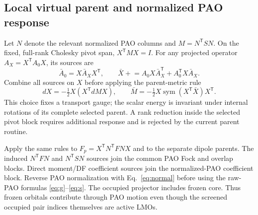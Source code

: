 \documentclass[11pt]{article}
\newcommand{\T}{^{\mathsf T}}
\newcommand{\sym}{\operatorname{sym}}
\begin{document}
\subsection{Local virtual parent and normalized PAO response}
Let $N$ denote the relevant normalized PAO columns and $M=N\T S N$.
On the fixed, full-rank Cholesky pivot span, $X\T M X=I$. For any
projected operator $A_X=X\T A_0X$, its sources are
\begin{equation}
 \bar A_0=X\bar A_X X\T,\qquad
 \bar X\mathrel{+}=A_0X\bar A_X\T+A_0\T X\bar A_X.
\end{equation}
Combine all sources on $X$ before applying the parent-metric rule
\begin{equation}
 dX=-\tfrac12 X(X\T dM X),\qquad
 \bar M=-\tfrac12 X\sym(X\T\bar X)X\T.
 \label{eq:gradient-screened-parent}
\end{equation}
This choice fixes a transport gauge; the scalar energy is invariant under
internal rotations of its complete selected parent. A rank reduction
inside the selected pivot block requires additional response and is
rejected by the current parent routine.

Apply the same rules to $F_p=X\T N\T F N X$ and to the separate dipole
parents. The induced $N\T F N$ and $N\T S N$ sources join the common PAO
Fock and overlap blocks. Direct moment/DF coefficient sources join the
normalized-PAO coefficient block. Reverse PAO normalization with
Eq.~\eqref{eq:normal} before using the raw-PAO formulas
\eqref{eq:g}--\eqref{eq:s}. The occupied projector includes frozen core.
Thus frozen orbitals contribute through PAO motion even though the
screened occupied pair indices themselves are active LMOs.
\end{document}
